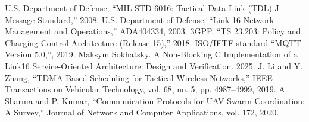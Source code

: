 \documentclass{article}
\begin{document}
\begin{thebibliography}{10}
 U.S. Department of Defense, ``MIL-STD-6016: Tactical Data Link (TDL) J-Message Standard,'' 2008.
 U.S. Department of Defense, ``Link 16 Network Management and Operations,'' ADA404334, 2003.
 3GPP, ``TS 23.203: Policy and Charging Control Architecture (Release 15),'' 2018.
 ISO/IETF standard ``MQTT Version 5.0,'', 2019.
 Maksym Sokhatsky. A Non-Blocking C Implementation of a Link16 Service-Oriented Architecture: Design and Verification. 2025.
 J. Li and Y. Zhang, ``TDMA-Based Scheduling for Tactical Wireless Networks,'' IEEE Transactions on Vehicular Technology, vol. 68, no. 5, pp. 4987--4999, 2019.
 A. Sharma and P. Kumar, ``Communication Protocols for UAV Swarm Coordination: A Survey,'' Journal of Network and Computer Applications, vol. 172, 2020.
\end{thebibliography}
\end{document}
